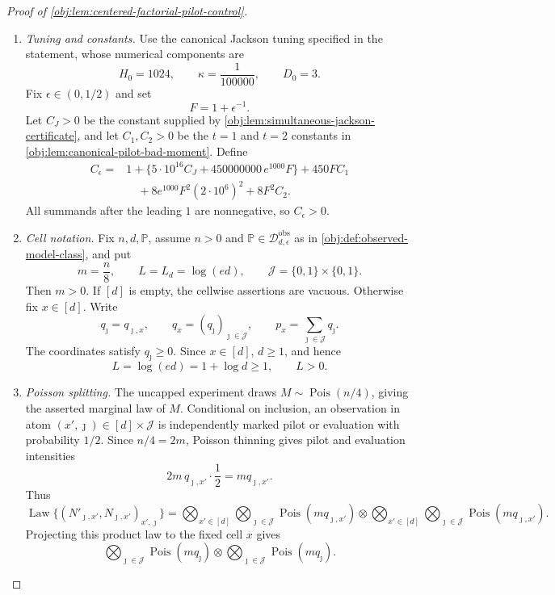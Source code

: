 \documentclass[11pt]{article}
\begin{document}
\begin{proof}[Proof of \cref{obj:lem:centered-factorial-pilot-control}]
\begin{enumerate}
\item \emph{Tuning and constants.}
Use the canonical Jackson tuning specified in the statement, whose numerical components are
\[
H_0=1024,\qquad \kappa=\frac1{100000},\qquad D_0=3 .
\]
Fix \(\epsilon\in(0,1/2)\) and set
\[
F=1+\epsilon^{-1}.
\]
Let \(C_J>0\) be the constant supplied by \cref{obj:lem:simultaneous-jackson-certificate}, and let
\(C_1,C_2>0\) be the \(t=1\) and \(t=2\) constants in
\cref{obj:lem:canonical-pilot-bad-moment}.  Define
\[
\begin{aligned}
C_\epsilon
={}&1+\{5\cdot10^{16}C_J+450000000\,e^{1000}F\}+450FC_1\\
&\quad+8e^{1000}F^2(2\cdot10^6)^2+8F^2C_2 .
\end{aligned}
\]
All summands after the leading \(1\) are nonnegative, so \(C_\epsilon>0\).

\item \emph{Cell notation.}
Fix \(n,d,\mathbb P\), assume \(n>0\) and
\(\mathbb P\in\mathcal D_{d,\epsilon}^{\mathrm{obs}}\) as in
\cref{obj:def:observed-model-class}, and put
\[
m=\frac n8,\qquad L=L_d=\log(ed),\qquad
\mathcal J=\{0,1\}\times\{0,1\}.
\]
Then \(m>0\).  If \([d]\) is empty, the cellwise assertions are vacuous.  Otherwise fix
\(x\in[d]\).  Write
\[
q_\jmath=q_{\jmath,x},\qquad
q_x=(q_\jmath)_{\jmath\in\mathcal J},\qquad
p_x=\sum_{\jmath\in\mathcal J}q_\jmath .
\]
The coordinates satisfy \(q_\jmath\ge0\).  Since \(x\in[d]\), \(d\ge1\), and hence
\[
L=\log(ed)=1+\log d\ge1,\qquad L>0 .
\]

\item \emph{Poisson splitting.}
The uncapped experiment draws \(M\sim\operatorname{Pois}(n/4)\), giving the asserted marginal law of \(M\).  Conditional on inclusion, an observation in atom \((x',\jmath)\in[d]\times\mathcal J\) is independently marked pilot or evaluation with probability \(1/2\).  Since \(n/4=2m\), Poisson thinning gives pilot and evaluation intensities
\[
2m\,q_{\jmath,x'}\cdot\frac12=mq_{\jmath,x'}.
\]
Thus
\[
\operatorname{Law}\{(N'_{\jmath,x'},N_{\jmath,x'})_{x',\jmath}\}
=
\bigotimes_{x'\in[d]}\bigotimes_{\jmath\in\mathcal J}
\operatorname{Pois}(m q_{\jmath,x'})
\otimes
\bigotimes_{x'\in[d]}\bigotimes_{\jmath\in\mathcal J}
\operatorname{Pois}(m q_{\jmath,x'}) .
\]
Projecting this product law to the fixed cell \(x\) gives
\[
\bigotimes_{\jmath\in\mathcal J}\operatorname{Pois}(m q_{\jmath})
\otimes
\bigotimes_{\jmath\in\mathcal J}\operatorname{Pois}(m q_{\jmath}) .
\]


\end{enumerate}
\end{proof}
\end{document}
